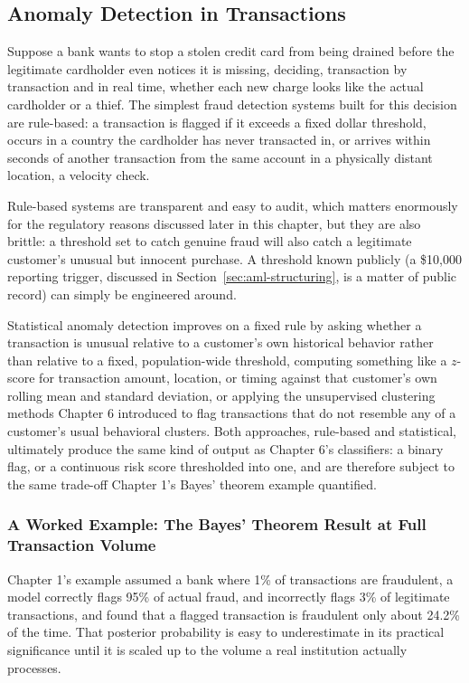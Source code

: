 \documentclass[../ai_in_finance]{subfiles}
\begin{document}
\subsection{Anomaly Detection in Transactions}
\label{sec:anomaly-bayes}

Suppose a bank wants to stop a stolen credit card from being drained before the legitimate cardholder even notices it is missing, deciding, transaction by transaction and in real time, whether each new charge looks like the actual cardholder or a thief. The simplest fraud detection systems built for this decision are rule-based: a transaction is flagged if it exceeds a fixed dollar threshold, occurs in a country the cardholder has never transacted in, or arrives within seconds of another transaction from the same account in a physically distant location, a velocity check.

Rule-based systems are transparent and easy to audit, which matters enormously for the regulatory reasons discussed later in this chapter, but they are also brittle: a threshold set to catch genuine fraud will also catch a legitimate customer's unusual but innocent purchase. A threshold known publicly (a \$10,000 reporting trigger, discussed in Section~\ref{sec:aml-structuring}, is a matter of public record) can simply be engineered around.

Statistical anomaly detection improves on a fixed rule by asking whether a transaction is unusual relative to a customer's own historical behavior rather than relative to a fixed, population-wide threshold, computing something like a $z$-score for transaction amount, location, or timing against that customer's own rolling mean and standard deviation, or applying the unsupervised clustering methods Chapter 6 introduced to flag transactions that do not resemble any of a customer's usual behavioral clusters. Both approaches, rule-based and statistical, ultimately produce the same kind of output as Chapter 6's classifiers: a binary flag, or a continuous risk score thresholded into one, and are therefore subject to the same trade-off Chapter 1's Bayes' theorem example quantified.

\subsubsection*{A Worked Example: The Bayes' Theorem Result at Full Transaction Volume}

Chapter 1's example assumed a bank where 1\% of transactions are fraudulent, a model correctly flags 95\% of actual fraud, and incorrectly flags 3\% of legitimate transactions, and found that a flagged transaction is fraudulent only about 24.2\% of the time. That posterior probability is easy to underestimate in its practical significance until it is scaled up to the volume a real institution actually processes.
\end{document}
